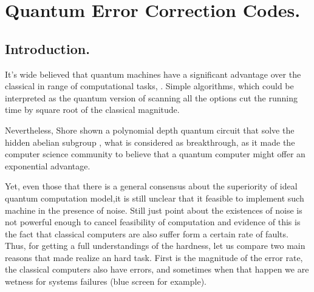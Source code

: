 \chapter{Quantum Error Correction Codes.}
\section{Introduction.}
It's wide believed that quantum machines have a significant advantage over the classical in range of computational tasks\cite{grover1996fast}, \cite{ahuja1999quantum}. Simple algorithms, which could be interpreted as the quantum version of scanning all the options cut the running time by square root of the classical magnitude. 

Nevertheless, Shore shown a polynomial depth quantum circuit that solve the hidden abelian subgroup \cite{Shor_1997}, what is considered as breakthrough, as it made the computer science community to believe that a quantum computer might offer an exponential advantage.

Yet, even those that there is a general consensus about the superiority of ideal quantum computation model,it is still unclear that it feasible to implement such machine in the presence of noise.   
Still just point about the existences of noise is not powerful enough to cancel feasibility of computation and evidence of this is the fact that classical computers are also suffer form a certain rate of faults. Thus, for getting a full understandings of the hardness, let us compare two main reasons that made realize an hard task. 
First is the magnitude of the error rate, the classical computers also have errors, and sometimes when that happen we are wetness for systems failures (blue screen for example).     

 
